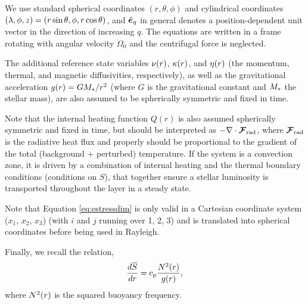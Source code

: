 \documentclass[12pt]{article}
\numberwithin{equation}{section}
\begin{document}
	We use standard spherical coordinates $(r,\theta,\phi)$ and cylindrical coordinates $(\lambda,\phi,z) = (r\sin\theta,\phi, r\cos\theta)$, and $\hat{\bm{e}}_q$ in general denotes a position-dependent unit vector in the direction of increasing $q$. The equations are written in a frame rotating with angular velocity $\Omega_0$ and the centrifugal force is neglected. 
	
	The additional reference state variables $\nu(r)$, $\kappa(r)$, and $\eta(r)$ (the momentum, thermal, and magnetic diffusivities, respectively), as well as the gravitational acceleration $g(r)=GM_*/r^2$ (where $G$ is the gravitational constant and $M_*$ the stellar mass), are also assumed to be spherically symmetric and fixed in time. 
	
	Note that the internal heating function $Q(r)$ is also assumed spherically symmetric and fixed in time, but should be interpreted as $-\nabla\cdot{\bm{\mathcal{F}}}_{\rm{rad}}$, where ${\bm{\mathcal{F}}}_{\rm{rad}}$ is the radiative heat flux and properly should be proportional to the gradient of the total (background + perturbed) temperature. If the system is a convection zone, it is driven by a combination of internal heating and the thermal boundary conditions (conditions on $S$), that together ensure a stellar luminosity is transported throughout the layer in a steady state. 
	
	Note that Equation \eqref{eq:estressdim} is only valid in a Cartesian coordinate system ($x_1$, $x_2$, $x_3$) (with $i$ and $j$ running over 1, 2, 3) and is translated into spherical coordinates before being used in Rayleigh. 
	
	Finally, we recall the relation,
	\begin{align}
		\frac{d\overline{S}}{dr} = c_{\rm{p}} \frac{N^2(r)}{g(r)},
	\end{align}
	where $N^2(r)$ is the squared buoyancy frequency. 
	
\end{document}
